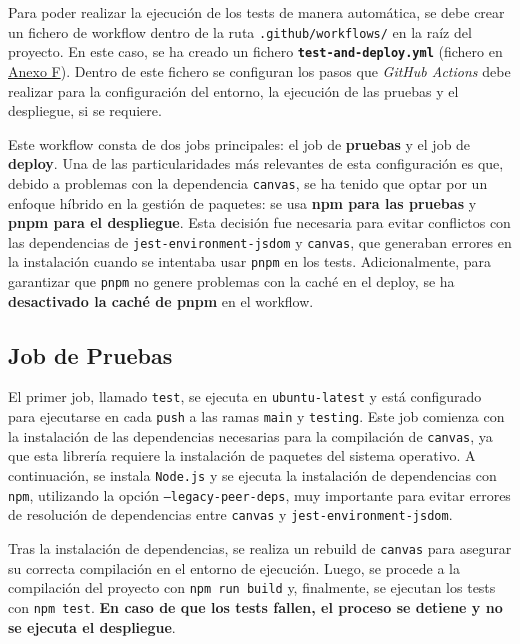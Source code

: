 Para poder realizar la ejecución de los tests de manera automática, se debe crear un fichero de workflow dentro de la ruta \texttt{.github/workflows/} en la raíz del proyecto. En este caso, se ha creado un fichero \textbf{\texttt{test-and-deploy.yml}} (fichero en \hyperref[ch:anexoF]{Anexo F}). Dentro de este fichero se configuran los pasos que \textit{GitHub Actions} debe realizar para la configuración del entorno, la ejecución de las pruebas y el despliegue, si se requiere.

Este workflow consta de dos jobs principales: el job de \textbf{pruebas} y el job de \textbf{deploy}. Una de las particularidades más relevantes de esta configuración es que, debido a problemas con la dependencia \texttt{canvas}, se ha tenido que optar por un enfoque híbrido en la gestión de paquetes: se usa \textbf{npm para las pruebas} y \textbf{pnpm para el despliegue}. Esta decisión fue necesaria para evitar conflictos con las dependencias de \texttt{jest-environment-jsdom} y \texttt{canvas}, que generaban errores en la instalación cuando se intentaba usar \texttt{pnpm} en los tests. Adicionalmente, para garantizar que \texttt{pnpm} no genere problemas con la caché en el deploy, se ha \textbf{desactivado la caché de pnpm} en el workflow.

\subsection*{Job de Pruebas}

El primer job, llamado \texttt{test}, se ejecuta en \texttt{ubuntu-latest} y está configurado para ejecutarse en cada \texttt{push} a las ramas \texttt{main} y \texttt{testing}. Este job comienza con la instalación de las dependencias necesarias para la compilación de \texttt{canvas}, ya que esta librería requiere la instalación de paquetes del sistema operativo. A continuación, se instala \texttt{Node.js} y se ejecuta la instalación de dependencias con \texttt{npm}, utilizando la opción \texttt{--legacy-peer-deps}, muy importante para evitar errores de resolución de dependencias entre \texttt{canvas} y \texttt{jest-environment-jsdom}.

Tras la instalación de dependencias, se realiza un rebuild de \texttt{canvas} para asegurar su correcta compilación en el entorno de ejecución. Luego, se procede a la compilación del proyecto con \texttt{npm run build} y, finalmente, se ejecutan los tests con \texttt{npm test}. \textbf{En caso de que los tests fallen, el proceso se detiene y no se ejecuta el despliegue}.

